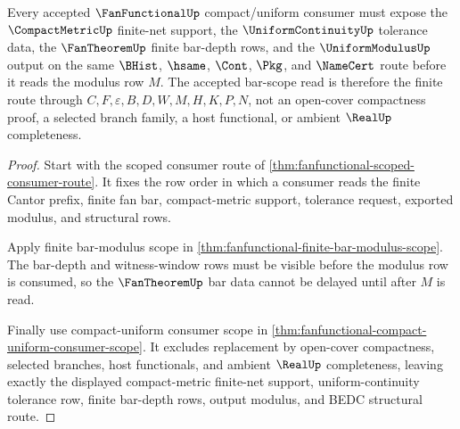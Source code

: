 \begin{theorem}
\label{thm:fanfunctional-compactmetric-uniform-bar-scope}
Every accepted $\FanFunctionalUp$ compact/uniform consumer must expose the $\CompactMetricUp$ finite-net support, the $\UniformContinuityUp$ tolerance data, the $\FanTheoremUp$ finite bar-depth rows, and the $\UniformModulusUp$ output on the same $\BHist$, $\hsame$, $\Cont$, $\Pkg$, and $\NameCert$ route before it reads the modulus row $M$. The accepted bar-scope read is therefore the finite route through $C,F,\varepsilon,B,D,W,M,H,K,P,N$, not an open-cover compactness proof, a selected branch family, a host functional, or ambient $\RealUp$ completeness.
\end{theorem}
\begin{proof}
Start with the scoped consumer route of \autoref{thm:fanfunctional-scoped-consumer-route}. It fixes the row order in which a consumer reads the finite Cantor prefix, finite fan bar, compact-metric support, tolerance request, exported modulus, and structural rows.

Apply finite bar-modulus scope in \autoref{thm:fanfunctional-finite-bar-modulus-scope}. The bar-depth and witness-window rows must be visible before the modulus row is consumed, so the $\FanTheoremUp$ bar data cannot be delayed until after $M$ is read.

Finally use compact-uniform consumer scope in \autoref{thm:fanfunctional-compact-uniform-consumer-scope}. It excludes replacement by open-cover compactness, selected branches, host functionals, and ambient $\RealUp$ completeness, leaving exactly the displayed compact-metric finite-net support, uniform-continuity tolerance row, finite bar-depth rows, output modulus, and BEDC structural route.
\end{proof}

